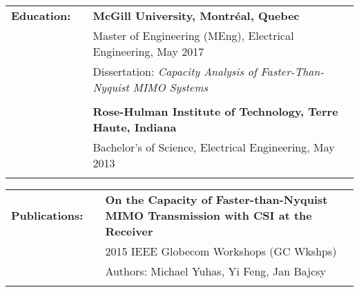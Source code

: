 \documentclass{minimal}
\begin{document}
\begin{tabular}{ p{1.5cm} p{1cm} p{16cm} }
\textbf{Education:} & & \textbf{McGill University, Montréal, Quebec} \\
& & Master of Engineering (MEng), Electrical Engineering, May 2017\\
& & Dissertation: \textit{Capacity Analysis of Faster-Than-Nyquist MIMO Systems}\\
& & \\
& & \textbf{Rose-Hulman Institute of Technology, Terre Haute, Indiana} \\
& & Bachelor's of Science, Electrical Engineering, May 2013\\
& & \\
\end{tabular}

\begin{tabular}{ p{1.5cm} p{1cm} p{16cm} }
\textbf{Publications:} & & \textbf{On the Capacity of Faster-than-Nyquist MIMO Transmission with CSI at the Receiver}\\
& & 2015 IEEE Globecom Workshops (GC Wkshps)\\
& & Authors: Michael Yuhas, Yi Feng, Jan Bajcsy\\
& & \\
\end{tabular}
\end{document}
